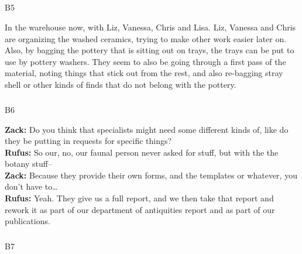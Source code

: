 \documentclass[
  canadian,
]{article}
\makeatletter
\let\oldsubparagraph\subparagraph
\renewcommand{\subparagraph}{
    \@ifstar
      \xxxSubParagraphStar
      \xxxSubParagraphNoStar
  }
\newcommand{\xxxSubParagraphStar}[1]{\oldsubparagraph*{#1}\mbox{}}
\newcommand{\xxxSubParagraphNoStar}[1]{\oldsubparagraph{#1}\mbox{}}
\makeatother
\begin{document}
\subparagraph{B5}\label{sec-B5}

In the warehouse now, with Liz, Vanessa, Chris and Lisa. Liz, Vanessa
and Chris are organizing the washed ceramics, trying to make other work
easier later on. Also, by bagging the pottery that is sitting out on
trays, the trays can be put to use by pottery washers. They seem to also
be going through a first pass of the material, noting things that stick
out from the rest, and also re-bagging stray shell or other kinds of
finds that do not belong with the pottery.

\subparagraph{B6}\label{sec-B6}

\textbf{Zack:} Do you think that specialists might need some different
kinds of, like do they be putting in requests for specific things?\\
\textbf{Rufus:} So our, no, our faunal person never asked for stuff, but
with the the botany stuff--\\
\textbf{Zack:} Because they provide their own forms, and the templates
or whatever, you don't have to\ldots{}\\
\textbf{Rufus:} Yeah. They give us a full report, and we then take that
report and rework it as part of our department of antiquities report and
as part of our publications.

\subparagraph{B7}\label{sec-B7}
\end{document}

